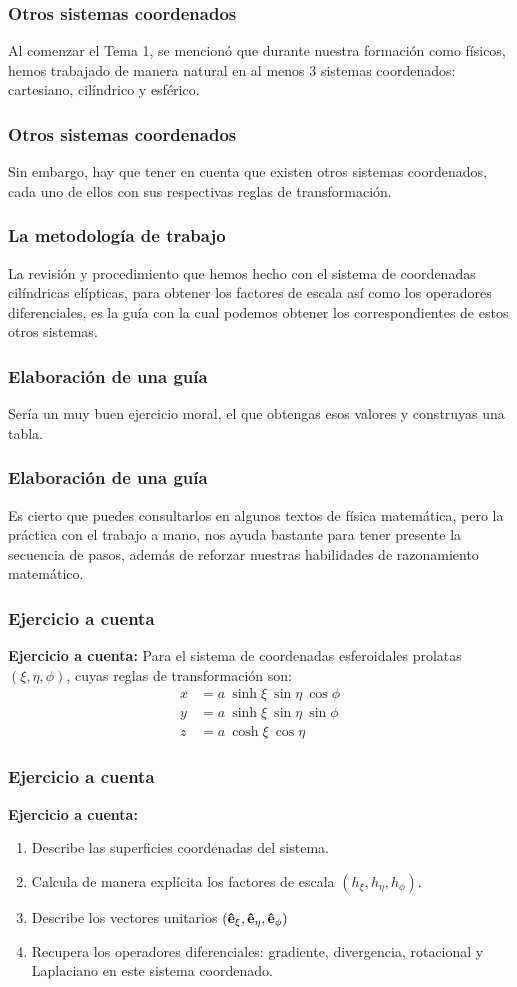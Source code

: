 \documentclass[12pt]{beamer}
\begin{document}
\begin{frame}
\frametitle{Otros sistemas coordenados}
Al comenzar el Tema 1, se mencionó que durante nuestra formación como físicos, hemos trabajado de manera natural en al menos $3$ sistemas coordenados: cartesiano, cilíndrico y esférico.
\end{frame}
\begin{frame}
\frametitle{Otros sistemas coordenados}
Sin embargo, hay que tener en cuenta que existen otros sistemas coordenados, cada uno de ellos con sus respectivas reglas de transformación.
\end{frame}
\begin{frame}
\frametitle{La metodología de trabajo}
La revisión y procedimiento que hemos hecho con el sistema de coordenadas cilíndricas elípticas, para obtener los factores de escala así como los operadores diferenciales, es la guía con la cual podemos obtener los correspondientes de estos otros sistemas.
\end{frame}
\begin{frame}
\frametitle{Elaboración de una guía}
Sería un muy buen ejercicio moral, el que obtengas esos valores y construyas una tabla.
\end{frame}
\begin{frame}
\frametitle{Elaboración de una guía}
Es cierto que puedes consultarlos en algunos textos de física matemática, pero la práctica con el trabajo a mano, nos ayuda bastante para tener presente la secuencia de pasos, además de reforzar nuestras habilidades de razonamiento matemático.
\end{frame}
\begin{frame}
\frametitle{Ejercicio a cuenta}
\textbf{Ejercicio a cuenta: } 
Para el sistema de coordenadas esferoidales prolatas $(\xi, \eta, \phi)$, cuyas reglas de transformación son:
\begin{align*}
x &= a \: \sinh \xi \: \sin \eta \: \cos \phi\\
y &= a \: \sinh \xi \: \sin \eta \: \sin \phi\\
z &= a \: \cosh \xi \: \cos \eta
\end{align*}
\end{frame}
\begin{frame}
\frametitle{Ejercicio a cuenta}
\textbf{Ejercicio a cuenta: } 
\begin{enumerate}[<+->]
\item Describe las superficies coordenadas del sistema.
\item Calcula de manera explícita los factores de escala $(h_{\xi}, h_{\eta}, h_{\phi})$.
\item Describe los vectores unitarios $(\vu{e}_{\xi}, \vu{e}_{\eta}, \vu{e}_{\phi})$
\item Recupera los operadores diferenciales: gradiente, divergencia, rotacional y Laplaciano en este sistema coordenado.
\end{enumerate}
\end{frame}
\end{document}
